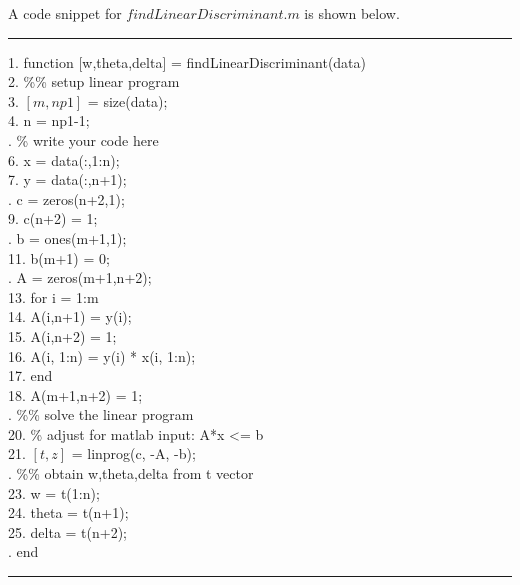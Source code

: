\begin{enumerate}
\begin{enumerate}
	A code snippet for $findLinearDiscriminant.m$ is shown below. \\
	\noindent\rule[0.5ex]{\linewidth}{1pt}
	1.	function [w,theta,delta] = findLinearDiscriminant(data)\\
	2.	{\color{blue} \%\% setup linear program} \\
	3.	$[m, np1]$ = size(data);\\
	4.	n = np1-1;\\
	.	{\color{blue} \% write your code here}\\
	6.	x = data(:,1:n);\\
	7.	y = data(:,n+1);\\
	.	c = zeros(n+2,1);\\
	9.	c(n+2) = 1;\\
	.	b = ones(m+1,1);\\
	11.	b(m+1) = 0;\\
	.	A = zeros(m+1,n+2);\\
	13.	for i = 1:m\\
    	14.	\qquad A(i,n+1) = y(i);\\
    	15.	\qquad A(i,n+2) = 1;\\
    	16.	\qquad A(i, 1:n) = y(i) * x(i, 1:n);\\
	17.	end\\
	18.	A(m+1,n+2) = 1;\\
	.	{\color{blue}\%\% solve the linear program}\\
	20.	{\color{blue}\% adjust for matlab input: A*x <= b}\\
	21.	$[t, z]$ = linprog(c, -A, -b);\\
	.	{\color{blue}\%\% obtain w,theta,delta from t vector}\\
	23.	w = t(1:n);\\
	24.	theta = t(n+1);\\
	25.	delta = t(n+2);\\
	.	end\\
	\noindent\rule[0.5ex]{\linewidth}{1pt}
	

\end{enumerate}
\end{enumerate}
